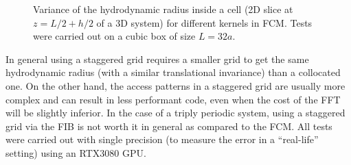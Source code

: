 \documentclass[ twoside,openright,titlepage,numbers=noenddot,%
headinclude,footinclude,cleardoublepage=empty,abstract=on,
BCOR=5mm,paper=b5,fontsize=11pt, dvipsnames
]{scrreprt}
\newcommand{\gpu}{\gls{GPU}\xspace}
\begin{document}
\begin{figure}[H]
  \label{fig:ibm_gauss10pt}
  \caption{Variance of the hydrodynamic radius inside a cell (2D slice at $z=L/2+h/2$ of a 3D system) for different kernels in \gls{FCM}. Tests were carried out on a cubic box of size $L=32a$.} \label{fig:ibmvar}
\end{figure}

In general using a staggered grid requires a smaller grid to get the same hydrodynamic radius (with a similar translational invariance) than a collocated one. On the other hand, the access patterns in a staggered grid are usually more complex and can result in less performant code, even when the cost of the FFT will be slightly inferior. In the case of a triply periodic system, using a staggered grid via the \gls{FIB} is not worth it in general as compared to the \gls{FCM}.
All tests were carried out with single precision (to measure the error in a ``real-life'' setting) using an RTX3080 \gpu.


%

\newpage
\cleardoublepage
\end{document}
